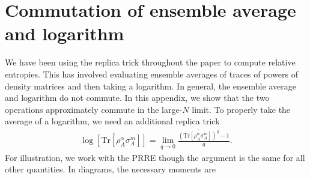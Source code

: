 \documentclass[a4paper,11pt]{article}
\newcommand{\Tr}{\text{Tr}}
\begin{document}
\section{Commutation of ensemble average and logarithm}
\label{commute_app}

We have been using the replica trick throughout the paper to compute relative entropies. This has involved evaluating ensemble averages of traces of powers of density matrices and then taking a logarithm. In general, the ensemble average and logarithm do not commute. In this appendix, we show that the two operations approximately commute in the large-$N$ limit. To properly take the average of a logarithm, we need an additional replica trick
\begin{align}
    \overline{\log \left[\Tr\left[ \rho_A^{\alpha} \sigma_A^{m}\right]\right]} = \lim_{q\rightarrow 0}\frac{ \overline{\left(\Tr\left[ \rho_A^{\alpha} \sigma_A^{m}\right]\right)^q}-1}{q}.
    \label{replica_log}
\end{align}
For illustration, we work with the PRRE though the argument is the same for all other quantities. In diagrams, the necessary moments are 
\end{document}
